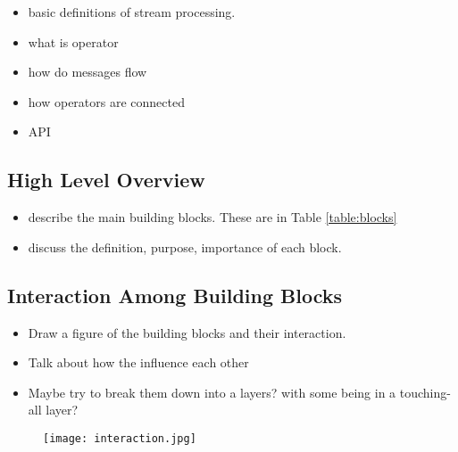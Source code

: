 \begin{itemize}
	\item basic definitions of stream processing. 
	\item what is operator
	\item how do messages flow
	\item how operators are connected
	\item API
\end{itemize}





\subsection{High Level Overview}
\begin{itemize}
	\item describe the main building blocks. These are in Table \ref{table:blocks}
	\item discuss the definition, purpose, importance of each block.	
\end{itemize}


\begin{table}[h]
\end{table}



\subsection{Interaction Among Building Blocks}

\begin{itemize}
	\item Draw a figure of the building blocks and their interaction. 
	\item Talk about how the influence each other
	\item Maybe try to break them down into a layers? with some being in a touching-all layer?
\end{itemize}


%

\begin{figure}[h]
	\centering
	\texttt{[image: interaction.jpg]}
	\caption{}
	\label{fig:tree-cpVScl}
\end{figure}


